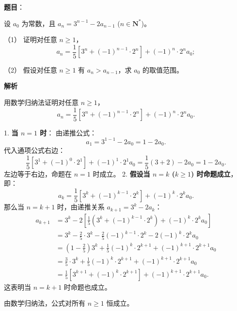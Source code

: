 \begin{answer}

\textbf{题目}：

设 $a_0$ 为常数，且 $a_n = 3^{n-1} - 2a_{n-1}$ ($n \in \mathbf{N}^*$)。

（1） 证明对任意 $n \ge 1$，
\nopagebreak[4]
\[a_n = \dfrac{1}{5}[3^n + (-1)^{n-1} \cdot 2^n] + (-1)^n \cdot 2^n a_0;\]

（2） 假设对任意 $n \ge 1$ 有 $a_n > a_{n-1}$，求 $a_0$ 的取值范围。

\textbf{解析}


用数学归纳法证明对任意 $n \ge 1$，
\nopagebreak[4]
\[a_n = \frac{1}{5}[3^n + (-1)^{n-1} \cdot 2^n] + (-1)^n \cdot 2^n a_0.\]

1. \textbf{当 $n = 1$ 时}：
   由递推公式：
\nopagebreak[4]
\[a_1 = 3^{1-1} - 2a_0 = 1 - 2a_0.\]
   代入通项公式右边：
\nopagebreak[4]
\[\frac{1}{5}[3^1 + (-1)^0 \cdot 2^1] + (-1)^1 \cdot 2^1 a_0 = \frac{1}{5}(3 + 2) - 2a_0 = 1 - 2a_0.\]
   左边等于右边，命题在 $n = 1$ 时成立。
2. \textbf{假设当 $n = k$ ($k \ge 1$) 时命题成立}，即：
\nopagebreak[4]
\[a_k = \frac{1}{5}[3^k + (-1)^{k-1} \cdot 2^k] + (-1)^k \cdot 2^k a_0.\]
   那么当 $n = k + 1$ 时，由递推关系 $a_{k+1} = 3^k - 2a_k$：
\nopagebreak[4]
\[\begin{aligned}
a_{k+1} &= 3^k - 2\left[\frac{1}{5}(3^k + (-1)^{k-1} \cdot 2^k) + (-1)^k \cdot 2^k a_0\right] \\
&= 3^k - \frac{2}{5} \cdot 3^k - \frac{2}{5} (-1)^{k-1} \cdot 2^k - 2(-1)^k \cdot 2^k a_0 \\
&= \left(1 - \frac{2}{5}\right) 3^k + \frac{1}{5} (-1)^k \cdot 2^{k+1} + (-1)^{k+1} \cdot 2^{k+1} a_0 \\
&= \frac{3}{5} \cdot 3^k + \frac{1}{5} (-1)^k \cdot 2^{k+1} + (-1)^{k+1} \cdot 2^{k+1} a_0 \\
&= \frac{1}{5}[3^{k+1} + (-1)^k \cdot 2^{k+1}] + (-1)^{k+1} \cdot 2^{k+1} a_0.
\end{aligned}\]
   这表明当 $n = k + 1$ 时命题也成立。

由数学归纳法，公式对所有 $n \ge 1$ 恒成立。



\end{answer}
